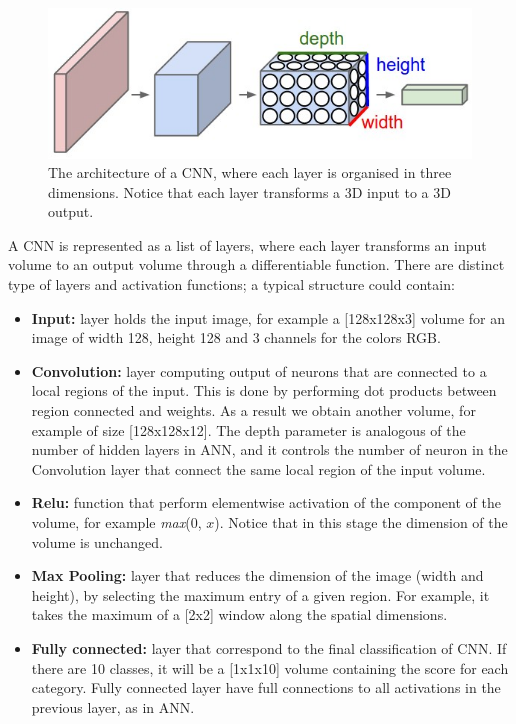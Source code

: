 \begin{figure}[htbp]
	\centering
	\includegraphics[scale=0.5]{cnn.png}
	\caption{The architecture of a CNN, where each layer is organised in three dimensions. Notice that each layer transforms a 3D input to a 3D output.}
	\label{CNN}
\end{figure}
\vspace{0.3cm}
A CNN is represented as a list of layers, where each layer transforms an input volume to an output volume through a differentiable function. There are distinct type of layers and activation functions; a typical structure could contain:
\begin{itemize}
	\item \textbf{Input:} layer holds the input image, for example a [128x128x3] volume for an image of width 128, height 128 and 3 channels for the colors RGB. 
	\item \textbf{Convolution:} layer computing output of neurons that are connected to a local regions of the input. This is done by performing dot products between region connected and weights. As a result we obtain another volume, for example of size [128x128x12]. The depth parameter is analogous of the number of hidden layers in ANN, and it controls the number of neuron in the Convolution layer that connect the same local region of the input volume. 
	\item \textbf{Relu:} function that perform elementwise activation of the component of the volume, for example \textit{max}(0, $x$). Notice that in this stage the dimension of the volume is unchanged. 
	\item \textbf{Max Pooling:} layer that reduces the dimension of the image (width and height), by selecting the maximum entry of a given region. For example, it takes the maximum of a [2x2] window along the spatial dimensions.
	\item \textbf{Fully connected:} layer that correspond to the final classification of CNN. If there are 10 classes, it will be a [1x1x10] volume containing the score for each category. Fully connected layer have full connections to all activations in the previous layer, as in ANN. 
\end{itemize}

